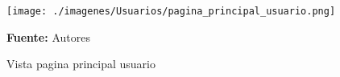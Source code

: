\begin{figure}[!htb]
  \begin{center}
\texttt{[image: ./imagenes/Usuarios/pagina\_principal\_usuario.png]}
    \caption{Vista pagina principal usuario}
    \label{fig:Vista_pagina_principal_usuario}
    \textbf{Fuente:}  Autores
  \end{center}
\end{figure}
